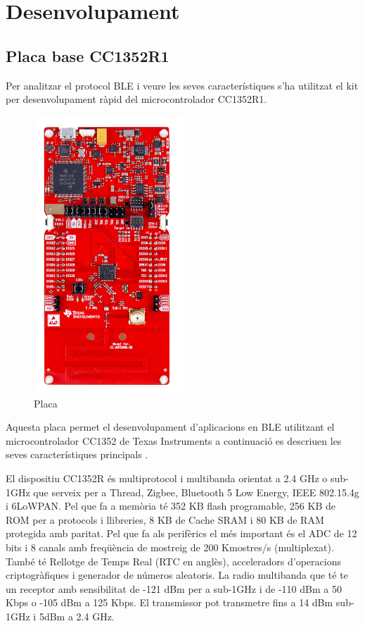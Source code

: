 \chapter{Desenvolupament}
\section{Placa base CC1352R1}
Per analitzar el protocol BLE i veure les seves característiques s'ha utilitzat el kit per desenvolupament ràpid del microcontrolador CC1352R1.
\begin{figure}[h!]
	\begin{center}
		\includegraphics[width=0.5\textwidth]{./images/launchxl-cc1352r1.jpg}
		\caption{Placa \cite{placa}}
	\end{center}
\end{figure}

Aquesta placa permet el desenvolupament d'aplicacions en BLE utilitzant el microcontrolador CC1352 de Texas Instruments a continuació es descriuen les seves característiques principals \cite{placa_datasheet}.

El dispositiu CC1352R és multiprotocol i multibanda orientat a 2.4 GHz o sub-1GHz que serveix per a Thread, Zigbee, Bluetooth 5 Low Energy, IEEE 802.15.4g i 6LoWPAN. Pel que fa a memòria té 352 KB flash programable, 256 KB de ROM per a protocols i llibreries, 8 KB de Cache SRAM i 80 KB de RAM protegida amb paritat.
Pel que fa als perifèrics el més important és el ADC de 12 bits i 8 canals amb freqüència de mostreig de 200 Kmostres/s (multiplexat). També té Rellotge de Temps Real (RTC en anglès), acceleradors d'operacions criptogràfiques i generador de números aleatoris.
La radio multibanda que té te un receptor amb sensibilitat de -121 dBm per a sub-1GHz i de -110 dBm a 50 Kbps o -105 dBm a 125 Kbps. El transmissor pot transmetre fins a 14 dBm sub-1GHz i 5dBm a 2.4 GHz.


